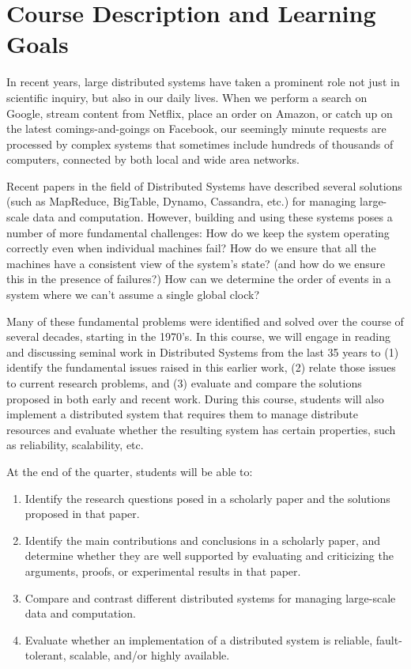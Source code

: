 \documentclass[11pt]{article}
\begin{document}
\pagebreak

\section{Course Description and Learning Goals}

In recent years, large distributed systems have taken a prominent role not just in scientific inquiry, but also in our daily lives. When we perform a search on Google, stream content from Netflix, place an order on Amazon, or catch up on the latest comings-and-goings on Facebook, our seemingly minute requests are processed by complex systems that sometimes include hundreds of thousands of computers, connected by both local and wide area networks.

Recent papers in the field of Distributed Systems have described several solutions (such as MapReduce, BigTable, Dynamo, Cassandra, etc.) for managing large-scale data and computation. However, building and using these systems poses a number of more fundamental challenges: How do we keep the system operating correctly even when individual machines fail? How do we ensure that all the machines have a consistent view of the system's state? (and how do we ensure this in the presence of failures?) How can we determine the order of events in a system where we can't assume a single global clock?

Many of these fundamental problems were identified and solved over the course of several decades, starting in the 1970's. In this course, we will engage in reading and discussing seminal work in Distributed Systems from the last 35 years to (1) identify the fundamental issues raised in this earlier work, (2) relate those issues to current research problems, and (3) evaluate and compare the solutions proposed in both early and recent work. During this course, students will also implement a distributed system that requires them to manage distribute resources and evaluate whether the resulting system has certain properties, such as reliability, scalability, etc.

At the end of the quarter, students will be able to:

\begin{enumerate}
 \item Identify the research questions posed in a scholarly paper and the solutions proposed in that paper.
 \item Identify the main contributions and conclusions in a scholarly paper, and determine whether they are well supported by evaluating and criticizing the arguments, proofs, or experimental results in that paper.
 \item Compare and contrast different distributed systems for managing large-scale data and computation.
 \item Evaluate whether an implementation of a distributed system is reliable, fault-tolerant, scalable, and/or highly available.
\end{enumerate}
\end{document}
